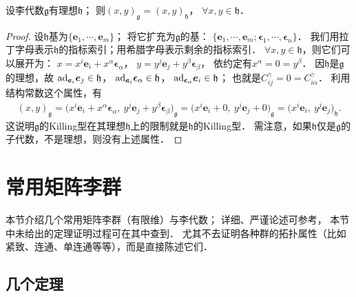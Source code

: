 \begin{proposition}\label{chlg:thm_Killing-gh}
    设李代数$\mathfrak{g}$有理想$\mathfrak{h}$；
    则$(x,y)_{\mathfrak{g}}=(x,y)_{\mathfrak{h}}$，
    $\forall x,y\in \mathfrak{h} $．
\end{proposition}
\begin{proof}
    设$\mathfrak{h}$基为$\{\boldsymbol{e}_1,\cdots,\boldsymbol{e}_m\}$；
    将它扩充为$\mathfrak{g}$的基：
    $\{\boldsymbol{e}_1,\cdots,\boldsymbol{e}_m;\boldsymbol{\epsilon}_1,\cdots,\boldsymbol{\epsilon}_n\}$．
    我们用拉丁字母表示$\mathfrak{h}$的指标索引；用希腊字母表示剩余的指标索引．
    $\forall x,y \in \mathfrak{h}$，则它们可以展开为：
    $x= x^i \boldsymbol{e}_i + x^\alpha \boldsymbol{\epsilon}_\alpha$，
    $y= y^j \boldsymbol{e}_j + y^\beta \boldsymbol{\epsilon}_\beta$，
    依约定有$x^\alpha=0=y^\beta$．
    因$\mathfrak{h}$是$\mathfrak{g}$的理想，故
    ${\rm ad}_{\boldsymbol{e}_i}\boldsymbol{e}_j \in  \mathfrak{h}$，
    ${\rm ad}_{\boldsymbol{e}_i}\boldsymbol{\epsilon}_\alpha \in  \mathfrak{h}$，
    ${\rm ad}_{\boldsymbol{\epsilon}_\alpha}\boldsymbol{e}_i \in  \mathfrak{h}$；
    也就是$C_{ij}^\gamma=0=C_{i\alpha}^\gamma$．
    利用结构常数这个属性，有
    \begin{align*}
        (x,y)_{\mathfrak{g}}= \bigl(x^i \boldsymbol{e}_i + x^\alpha \boldsymbol{\epsilon}_\alpha,\ 
        y^j \boldsymbol{e}_j + y^\beta \boldsymbol{\epsilon}_\beta\bigr)_{\mathfrak{g}}
        =\bigl(x^i \boldsymbol{e}_i + 0,\ y^j \boldsymbol{e}_j + 0\bigr)_{\mathfrak{g}}
        =\bigl(x^i\boldsymbol{e}_i ,\ y^j\boldsymbol{e}_j \bigr)_{\mathfrak{h}}.
    \end{align*}
    这说明$\mathfrak{g}$的Killing型在其理想$\mathfrak{h}$上的限制就是$\mathfrak{h}$的Killing型．
    需注意，如果$\mathfrak{h}$仅是$\mathfrak{g}$的子代数，不是理想，则没有上述属性．
\end{proof}



\section{常用矩阵李群}\label{chlg:sec_matrixG-I}
本节介绍几个常用矩阵李群（有限维）与李代数；
详细、严谨论述可参考\parencite[Part I]{hall-2015}，  %
本节中未给出的定理证明过程可在其中查到．
尤其不去证明各种群的拓扑属性（比如紧致、连通、单连通等等），而是直接陈述它们．


\subsection{几个定理}

